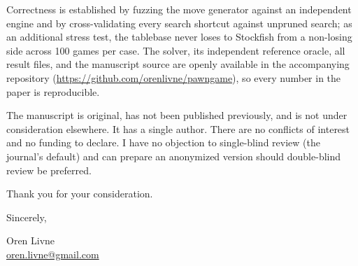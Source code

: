\documentclass[11pt]{article}
\begin{document}
Correctness is established by fuzzing the move generator against an independent
engine and by cross-validating every search shortcut against unpruned search; as an
additional stress test, the tablebase never loses to Stockfish from a non-losing
side across 100 games per case. The solver, its independent reference oracle, all
result files, and the manuscript source are openly available in the accompanying
repository (\url{https://github.com/orenlivne/pawngame}), so every number in the
paper is reproducible.

The manuscript is original, has not been published previously, and is not under
consideration elsewhere. It has a single author. There are no conflicts of interest
and no funding to declare. I have no objection to single-blind review (the journal's
default) and can prepare an anonymized version should double-blind review be
preferred.

\vspace{0.5em}
Thank you for your consideration.

\vspace{1em}
\noindent Sincerely,

\vspace{0.5em}
\noindent Oren Livne\\
\href{mailto:oren.livne@gmail.com}{oren.livne@gmail.com}
\end{document}
